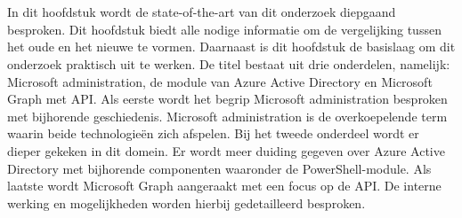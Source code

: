 \chapter{}%
\label{ch:stand-van-zaken}



\begin{comment}

Dit hoofdstuk bevat je literatuurstudie. De inhoud gaat verder op de inleiding, maar zal het onderwerp van de bachelorproef *diepgaand* uitspitten. De bedoeling is dat de lezer na lezing van dit hoofdstuk helemaal op de hoogte is van de huidige stand van zaken (state-of-the-art) in het onderzoeksdomein. Iemand die niet vertrouwd is met het onderwerp, weet nu voldoende om de rest van het verhaal te kunnen volgen, zonder dat die er nog andere informatie moet over opzoeken \autocite{Pollefliet2011}.

Je verwijst bij elke bewering die je doet, vakterm die je introduceert, enz.\ naar je bronnen. In \LaTeX{} kan dat met het commando \texttt{$\backslash${textcite\{\}}} of \texttt{$\backslash${autocite\{\}}}. Als argument van het commando geef je de ``sleutel'' van een ``record'' in een bibliografische databank in het Bib\LaTeX{}-formaat (een tekstbestand). Als je expliciet naar de auteur verwijst in de zin, gebruik je \texttt{$\backslash${}textcite\{\}}.
Soms wil je de auteur niet expliciet vernoemen, dan gebruik je \texttt{$\backslash${}autocite\{\}}. In de volgende paragraaf een voorbeeld van elk.

\textcite{Knuth1998} schreef een van de standaardwerken over sorteer- en zoekalgoritmen. Experten zijn het erover eens dat cloud computing een interessante opportuniteit vormen, zowel voor gebruikers als voor dienstverleners op vlak van informatietechnologie~\autocite{Creeger2009}.

\end{comment}

In dit hoofdstuk wordt de state-of-the-art van dit onderzoek diepgaand besproken. Dit hoofdstuk biedt alle nodige informatie om de vergelijking tussen het oude en het nieuwe te vormen. Daarnaast is dit hoofdstuk de basislaag om dit onderzoek praktisch uit te werken. De titel bestaat uit drie onderdelen, namelijk: Microsoft administration, de module van Azure Active Directory en Microsoft Graph met \ac{API}. Als eerste wordt het begrip Microsoft administration besproken met bijhorende geschiedenis. Microsoft administration is de overkoepelende term waarin beide technologieën zich afspelen. Bij het tweede onderdeel wordt er dieper gekeken in dit domein. Er wordt meer duiding gegeven over Azure Active Directory met bijhorende componenten waaronder de PowerShell-module. Als laatste wordt Microsoft Graph aangeraakt met een focus op de \ac{API}. De interne werking en mogelijkheden worden hierbij gedetailleerd besproken.


